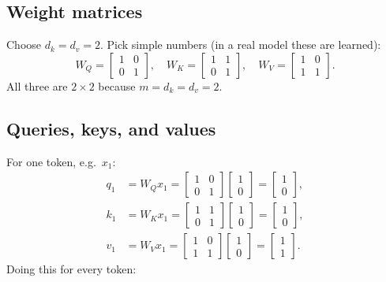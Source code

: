 \documentclass[11pt]{article}
\begin{document}
\subsection{Weight matrices}

Choose \(d_k = d_v = 2\). Pick simple numbers (in a real model these are learned):
\[
  W_Q = \begin{bmatrix}1&0\\0&1\end{bmatrix},\quad
  W_K = \begin{bmatrix}1&1\\0&1\end{bmatrix},\quad
  W_V = \begin{bmatrix}1&0\\1&1\end{bmatrix}.
\]
All three are \(2\times 2\) because \(m=d_k=d_v=2\).

\subsection{Queries, keys, and values}

For one token, e.g.\ \(x_1\):
\begin{align*}
  q_1 &= W_Q x_1 = \begin{bmatrix}1&0\\0&1\end{bmatrix}\begin{bmatrix}1\\0\end{bmatrix}
       = \begin{bmatrix}1\\0\end{bmatrix}, \\
  k_1 &= W_K x_1 = \begin{bmatrix}1&1\\0&1\end{bmatrix}\begin{bmatrix}1\\0\end{bmatrix}
       = \begin{bmatrix}1\\0\end{bmatrix}, \\
  v_1 &= W_V x_1 = \begin{bmatrix}1&0\\1&1\end{bmatrix}\begin{bmatrix}1\\0\end{bmatrix}
       = \begin{bmatrix}1\\1\end{bmatrix}.
\end{align*}
Doing this for every token:
\end{document}
